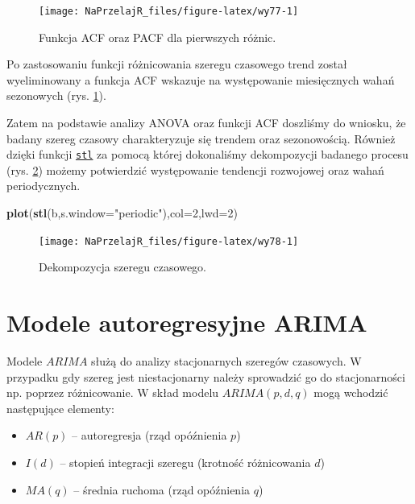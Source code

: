 \documentclass[polish,]{book}
\newenvironment{Shaded}{\begin{snugshade}}{\end{snugshade}}
\newcommand{\DataTypeTok}[1]{\textcolor[rgb]{0.13,0.29,0.53}{#1}}
\newcommand{\DecValTok}[1]{\textcolor[rgb]{0.00,0.00,0.81}{#1}}
\newcommand{\KeywordTok}[1]{\textcolor[rgb]{0.13,0.29,0.53}{\textbf{#1}}}
\newcommand{\NormalTok}[1]{#1}
\newcommand{\StringTok}[1]{\textcolor[rgb]{0.31,0.60,0.02}{#1}}
\begin{document}
\begin{figure}[h]

{\centering \texttt{[image: NaPrzelajR\_files/figure-latex/wy77-1]} 

}

\caption{Funkcja ACF oraz PACF dla pierwszych różnic.}\label{fig:wy77}
\end{figure}

Po zastosowaniu funkcji różnicowania szeregu czasowego trend został wyeliminowany a funkcja ACF wskazuje na występowanie miesięcznych wahań sezonowych
(rys. \ref{fig:wy77}).

Zatem na podstawie analizy ANOVA oraz funkcji ACF doszliśmy do wniosku,
że badany szereg czasowy charakteryzuje się trendem oraz sezonowością. Również
dzięki funkcji \href{https://rdrr.io/r/stats/stl.html}{\texttt{stl}} za pomocą której dokonaliśmy dekompozycji badanego
procesu (rys. \ref{fig:wy78}) możemy potwierdzić występowanie tendencji rozwojowej oraz
wahań periodycznych.

\begin{Shaded}
\begin{Highlighting}[]
\KeywordTok{plot}\NormalTok{(}\KeywordTok{stl}\NormalTok{(b,}\DataTypeTok{s.window=}\StringTok{"periodic"}\NormalTok{),}\DataTypeTok{col=}\DecValTok{2}\NormalTok{,}\DataTypeTok{lwd=}\DecValTok{2}\NormalTok{)}
\end{Highlighting}
\end{Shaded}

\begin{figure}[h]

{\centering \texttt{[image: NaPrzelajR\_files/figure-latex/wy78-1]} 

}

\caption{Dekompozycja szeregu czasowego.}\label{fig:wy78}
\end{figure}

\hypertarget{part_73}{%
\section{Modele autoregresyjne ARIMA}\label{part_73}}

Modele \(ARIMA\) służą do analizy stacjonarnych szeregów czasowych. W przypadku
gdy szereg jest niestacjonarny należy sprowadzić go do stacjonarności np. poprzez
różnicowanie. W skład modelu \(ARIMA(p, d, q)\) mogą wchodzić następujące elementy:

\begin{itemize}
\item
  \(AR(p)\) -- autoregresja (rząd opóźnienia \(p\))
\item
  \(I(d)\) -- stopień integracji szeregu (krotność różnicowania \(d\))
\item
  \(MA(q)\) -- średnia ruchoma (rząd opóźnienia \(q\))
\end{itemize}
\end{document}
